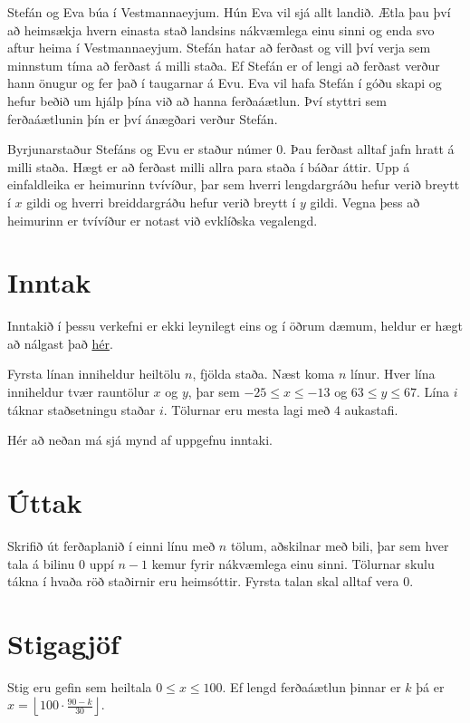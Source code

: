 Stefán og Eva búa í Vestmannaeyjum. Hún Eva vil sjá allt landið.
Ætla þau því að heimsækja hvern einasta stað landsins nákvæmlega einu sinni og enda svo aftur heima í Vestmannaeyjum.
Stefán hatar að ferðast og vill því verja sem minnstum tíma að ferðast á milli staða. Ef Stefán er of lengi að ferðast verður hann önugur og fer það í taugarnar á Evu.
Eva vil hafa Stefán í góðu skapi og hefur beðið um hjálp þína við að hanna ferðaáætlun. Því styttri sem ferðaáætlunin þín er því ánægðari verður Stefán.

Byrjunarstaður Stefáns og Evu er staður númer $0$. Þau ferðast alltaf jafn hratt á milli staða. Hægt er að ferðast milli allra para staða í báðar áttir.
Upp á einfaldleika er heimurinn tvívíður, þar sem hverri lengdargráðu hefur verið breytt í $x$ gildi og hverri breiddargráðu hefur verið breytt í $y$ gildi.
Vegna þess að heimurinn er tvívíður er notast við evklíðska vegalengd.

\section*{Inntak}
Inntakið í þessu verkefni er ekki leynilegt eins og í öðrum dæmum, heldur er hægt að nálgast það \href{/problems/iceland.landsreisa/file/statement/attachments/iceland.txt}{hér}.

Fyrsta línan inniheldur heiltölu $n$, fjölda staða.
Næst koma $n$ línur. Hver lína inniheldur tvær rauntölur $x$ og $y$, þar sem $-25 \leq x \leq -13$ og $63 \leq y \leq 67$. Lína $i$ táknar staðsetningu staðar $i$.
Tölurnar eru mesta lagi með $4$ aukastafi.

Hér að neðan má sjá mynd af uppgefnu inntaki.

\section*{Úttak}
Skrifið út ferðaplanið í einni línu með $n$ tölum, aðskilnar með bili, þar sem hver tala á bilinu $0$ uppí $n-1$ kemur fyrir nákvæmlega einu sinni.
Tölurnar skulu tákna í hvaða röð staðirnir eru heimsóttir. Fyrsta talan skal alltaf vera $0$.

\section*{Stigagjöf}
Stig eru gefin sem heiltala $0 \leq x \leq 100$. Ef lengd ferðaáætlun þinnar er $k$ þá er $x = \left\lfloor 100 \cdot \frac{90 - k}{30} \right\rfloor$.

